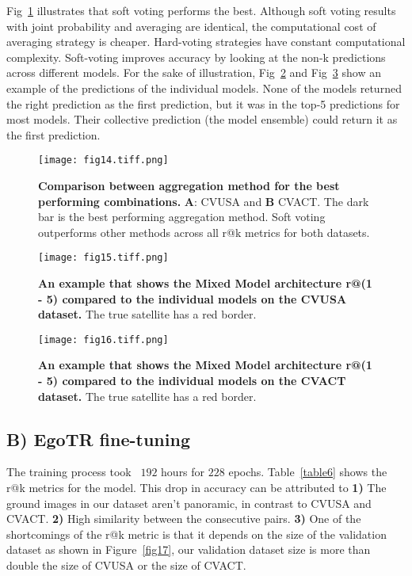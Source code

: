 \documentclass[10pt,letterpaper]{article}
\begin{document}
\FloatBarrier


Fig~\ref{fig14} illustrates that soft voting performs  the best. Although soft voting results with joint probability and averaging are identical, the computational cost of averaging strategy is cheaper. Hard-voting strategies have constant computational complexity. Soft-voting improves accuracy by looking at the non-k predictions across different models. For the sake of illustration,  Fig~\ref{fig15} and Fig~\ref{fig16} show an example of the predictions of the individual models. None of the models returned the right prediction as the first prediction, but it was in the top-5 predictions for most models. Their collective prediction (the model ensemble) could return it as the first prediction.

\begin{figure}[!h]
  \caption{{\bf Comparison between aggregation method for the best performing combinations. } {\bf A}: CVUSA and {\bf B} CVACT.  The dark bar is the best performing aggregation method. Soft voting outperforms other methods across all r@k metrics for both datasets.}
  
  \texttt{[image: fig14.tiff.png]}
  \label{fig14}
\end{figure}

\begin{figure}[!h]
  \caption{{\bf An example that shows the Mixed Model architecture r@(1 - 5) compared to the individual models on the CVUSA dataset.} The true satellite has a red border.}
  \texttt{[image: fig15.tiff.png]}
  \label{fig15}
\end{figure}

\begin{figure}[!h]
  \caption{{\bf An example that shows the Mixed Model architecture r@(1 - 5) compared to the individual models on the CVACT dataset.}  The true satellite has a red border.}
  \texttt{[image: fig16.tiff.png]}
  \label{fig16}
\end{figure}

\FloatBarrier

\subsection*{B) EgoTR fine-tuning}

The training process took ~$192$ hours for $228$ epochs. Table~\ref{table6} shows the r@k metrics for the model. This drop in accuracy can be attributed to {\bf 1)} The ground images in our dataset aren't panoramic, in contrast to CVUSA and CVACT. {\bf 2)} High similarity between the consecutive pairs. {\bf 3)} One of the shortcomings of the r@k metric is that it depends on the size of the validation dataset as shown in  Figure~\ref{fig17}, our validation dataset size is more than double the size of CVUSA or the size of CVACT.
\end{document}
